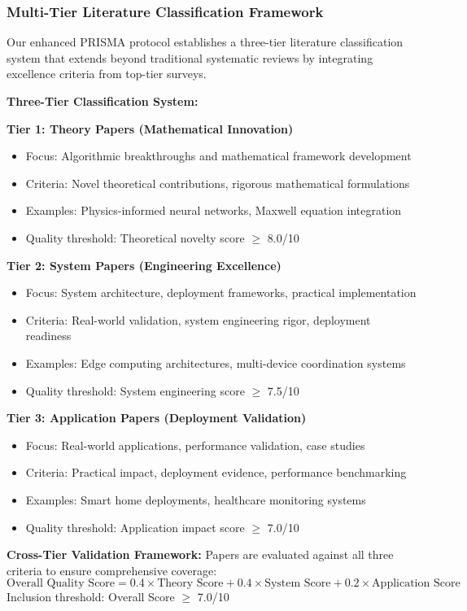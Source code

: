 \documentclass[journal]{IEEEtran}
\begin{document}
\subsubsection{Multi-Tier Literature Classification Framework}

Our enhanced PRISMA protocol establishes a three-tier literature classification system that extends beyond traditional systematic reviews by integrating excellence criteria from top-tier surveys.

\textbf{Three-Tier Classification System:}

\textbf{Tier 1: Theory Papers (Mathematical Innovation)}
\begin{itemize}
\item Focus: Algorithmic breakthroughs and mathematical framework development
\item Criteria: Novel theoretical contributions, rigorous mathematical formulations
\item Examples: Physics-informed neural networks, Maxwell equation integration
\item Quality threshold: Theoretical novelty score $\geq$ 8.0/10
\end{itemize}

\textbf{Tier 2: System Papers (Engineering Excellence)}
\begin{itemize}
\item Focus: System architecture, deployment frameworks, practical implementation
\item Criteria: Real-world validation, system engineering rigor, deployment readiness
\item Examples: Edge computing architectures, multi-device coordination systems
\item Quality threshold: System engineering score $\geq$ 7.5/10
\end{itemize}

\textbf{Tier 3: Application Papers (Deployment Validation)}
\begin{itemize}
\item Focus: Real-world applications, performance validation, case studies
\item Criteria: Practical impact, deployment evidence, performance benchmarking
\item Examples: Smart home deployments, healthcare monitoring systems
\item Quality threshold: Application impact score $\geq$ 7.0/10
\end{itemize}

\textbf{Cross-Tier Validation Framework:}
Papers are evaluated against all three criteria to ensure comprehensive coverage:
\begin{equation}
\text{Overall Quality Score} = 0.4 \times \text{Theory Score} + 0.4 \times \text{System Score} + 0.2 \times \text{Application Score}
\label{eq:quality_score}
\end{equation}
Inclusion threshold: Overall Score $\geq$ 7.0/10
\end{document}
